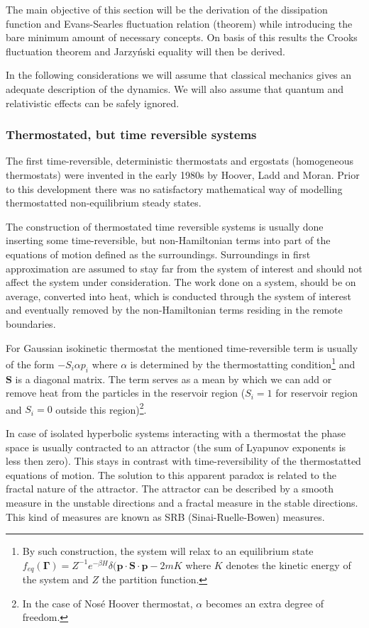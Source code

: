 \documentclass[a4paper,12pt]{article}
\begin{document}
The main objective of this section will be the derivation of the dissipation function and Evans-Searles fluctuation relation (theorem) while introducing the bare minimum amount of necessary concepts. On basis of this results the Crooks fluctuation theorem and Jarzyński equality will then be derived.  

In the following considerations we will assume that classical mechanics gives an adequate description of the dynamics. We will also assume that quantum and relativistic effects can be safely ignored.

\subsubsection{Thermostated, but time reversible systems}

The first time-reversible, deterministic thermostats and ergostats (homogeneous thermostats) were invented in the early 1980s by Hoover, Ladd and Moran\cite{Hoover:1982dp}. Prior to this development there was no satisfactory mathematical way of modelling thermostatted non-equilibrium steady states.

The construction of thermostated time reversible systems is usually done inserting some time-reversible, but non-Hamiltonian terms into part of the equations of motion defined as the surroundings. Surroundings in first approximation are assumed to stay far from the system of interest and should not affect the system under consideration.
The work done on a system, should be on average, converted into heat, which is conducted through the system of interest and eventually removed by the non-Hamiltonian terms residing in the remote boundaries.

For Gaussian isokinetic thermostat the mentioned time-reversible term is usually of the form $- S_i \alpha p_i $ where $\alpha$ is determined by the thermostatting condition\footnote{By such construction, the system will relax to an equilibrium state $f_{eq}(\bm{\Gamma})=Z^{-1} e^{-\beta H}\delta(\bm{p}\cdot \bm{S}\cdot \bm{p}-2m K$ where $K$ denotes the kinetic energy of the system and $Z$ the partition function.} and $\textbf{S}$ is a diagonal matrix. The term serves as a mean by which we can add or remove heat from the particles in the reservoir region ($S_i =1$ for reservoir region and $S_i = 0$ outside this region)\footnote{In the case of Nosé Hoover thermostat, $\alpha$ becomes an extra degree of freedom\cite{Evans:2241458}.}.

In case of isolated hyperbolic systems interacting with a thermostat the phase space is usually contracted to an attractor (the sum of Lyapunov exponents is less then zero).
This stays in contrast with time-reversibility of the thermostatted equations of motion. The solution to this apparent paradox is related to the fractal nature of the attractor.
The attractor can be described by a smooth measure in the unstable directions and a fractal measure in the stable directions.
This kind of measures are known as SRB (Sinai-Ruelle-Bowen) measures\cite{Dorfman:ozm67-zD}. 
\end{document}
